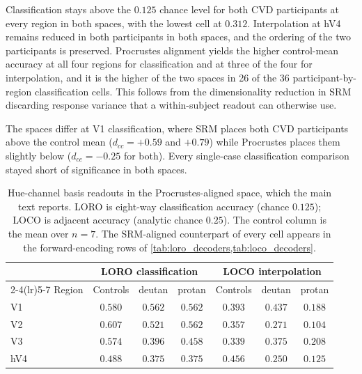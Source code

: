 Classification stays above the $0.125$ chance level for both CVD participants at every region in both spaces, with the lowest cell at $0.312$. Interpolation at hV4 remains reduced in both participants in both spaces, and the ordering of the two participants is preserved. Procrustes alignment yields the higher control-mean accuracy at all four regions for classification and at three of the four for interpolation, and it is the higher of the two spaces in 26 of the 36 participant-by-region classification cells. This follows from the dimensionality reduction in SRM discarding response variance that a within-subject readout can otherwise use.

The spaces differ at V1 classification, where SRM places both CVD participants above the control mean ($d_{cc} = +0.59$ and $+0.79$) while Procrustes places them slightly below ($d_{cc} = -0.25$ for both). Every single-case classification comparison stayed short of significance in both spaces.

\begin{table}[h]
\centering
\caption{Hue-channel basis readouts in the Procrustes-aligned space, which the main text reports. LORO is eight-way classification accuracy (chance $0.125$); LOCO is adjacent accuracy (analytic chance $0.25$). The control column is the mean over $n = 7$. The SRM-aligned counterpart of every cell appears in the forward-encoding rows of \cref{tab:loro_decoders,tab:loco_decoders}.}
\label{tab:alignment}
\begin{tabular}{lcccccc}
\toprule
& \multicolumn{3}{c}{LORO classification} & \multicolumn{3}{c}{LOCO interpolation} \\
\cmidrule(lr){2-4}\cmidrule(lr){5-7}
Region & Controls & deutan & protan & Controls & deutan & protan \\
\midrule
V1  & $0.580$ & $0.562$ & $0.562$ & $0.393$ & $0.437$ & $0.188$ \\
V2  & $0.607$ & $0.521$ & $0.562$ & $0.357$ & $0.271$ & $0.104$ \\
V3  & $0.574$ & $0.396$ & $0.458$ & $0.339$ & $0.375$ & $0.208$ \\
hV4 & $0.488$ & $0.375$ & $0.375$ & $0.456$ & $0.250$ & $0.125$ \\
\bottomrule
\end{tabular}
\end{table}


